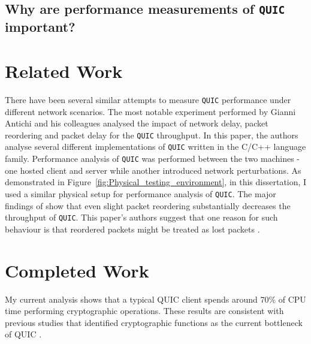 \documentclass[12pt,a4paper,twoside,openright]{report}
\begin{document}
\subsection{Why are performance measurements of \texttt{QUIC} important?}

\section{Related Work}
There have been several similar attempts to measure \texttt{QUIC} performance under different network scenarios. 
The most notable experiment performed by Gianni Antichi and his colleagues \cite{Making_QUIC_Quicker} analysed the impact of network delay, packet reordering and packet delay for the \texttt{QUIC} throughput. 
In this paper, the authors analyse several different implementations of \texttt{QUIC} written in the C/C++ language family.
Performance analysis of \texttt{QUIC} was performed between the two machines - one hosted client and server while another introduced network perturbations.
As demonstrated in Figure~\ref{fig:Physical_testing_environment}, in this dissertation, I used a similar physical setup for performance analysis of \texttt{QUIC}.
The major findings of \cite{Making_QUIC_Quicker} show that even slight packet reordering substantially decreases the throughput of \texttt{QUIC}.
This paper's authors suggest that one reason for such behaviour is that reordered packets might be treated as lost packets \cite{Making_QUIC_Quicker}. 










\section{Completed Work}
My current analysis shows that a typical QUIC client spends around 70\% of CPU time performing cryptographic operations. 
These results are consistent with previous studies that identified cryptographic functions as the current bottleneck of QUIC \cite{Making_QUIC_Quicker}.






\end{document}
